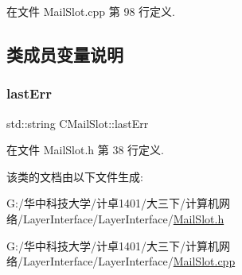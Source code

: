 在文件 Mail\+Slot.\+cpp 第 98 行定义.



\subsection{类成员变量说明}
\mbox{\label{class_c_mail_slot_a4e3521651dae10b64456ad61b2612009}} 
\subsubsection{\texorpdfstring{last\+Err}{lastErr}}
{\footnotesize\ttfamily std\+::string C\+Mail\+Slot\+::last\+Err}



在文件 Mail\+Slot.\+h 第 38 行定义.



该类的文档由以下文件生成\+:\begin{DoxyCompactItemize}
\item 
G\+:/华中科技大学/计卓1401/大三下/计算机网络/\+Layer\+Interface/\+Layer\+Interface/\hyperlink{_layer_interface_2_mail_slot_8h}{Mail\+Slot.\+h}\item 
G\+:/华中科技大学/计卓1401/大三下/计算机网络/\+Layer\+Interface/\+Layer\+Interface/\hyperlink{_layer_interface_2_mail_slot_8cpp}{Mail\+Slot.\+cpp}\end{DoxyCompactItemize}
